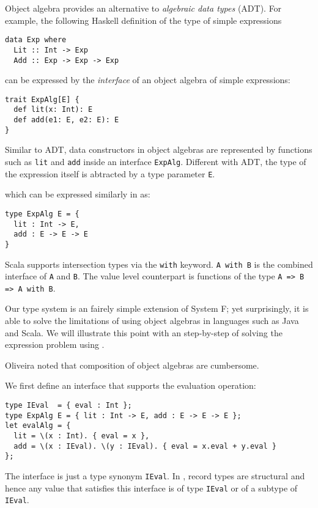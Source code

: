Object algebra provides an alternative to \emph{algebraic data types} (ADT). For example, the
following Haskell definition of the type of simple expressions
\begin{verbatim}
data Exp where
  Lit :: Int -> Exp
  Add :: Exp -> Exp -> Exp
\end{verbatim}
can be expressed by the \emph{interface} of an object algebra of simple expressions:
\begin{verbatim}
trait ExpAlg[E] {
  def lit(x: Int): E
  def add(e1: E, e2: E): E
}
\end{verbatim}
Similar to ADT, data constructors in object algebras are represented by functions such as
\lstinline{lit} and \lstinline{add} inside an interface \lstinline{ExpAlg}.
Different with ADT, the type of the expression itself is abtracted by a type
parameter \lstinline{E}.

which can be expressed similarly in \systemfi as:
\begin{verbatim}
type ExpAlg E = {
  lit : Int -> E,
  add : E -> E -> E
}
\end{verbatim}

Scala supports intersection types via the \lstinline{with} keyword. \lstinline{A with B}
is the combined interface of \lstinline{A} and \lstinline{B}. The
value level counterpart is functions of the type \lstinline {A => B => A with B}.

Our type system is an fairely simple extension of System F; yet surprisingly, it
is able to solve the limitations of using object algebras in languages such as
Java and Scala. We will illustrate this point with an step-by-step of solving
the expression problem using \systemFI.

Oliveira noted that composition of object algebras are cumbersome.

We first define an interface that supports the evaluation operation:

\begin{verbatim}
type IEval  = { eval : Int };
type ExpAlg E = { lit : Int -> E, add : E -> E -> E };
let evalAlg = {
  lit = \(x : Int). { eval = x },
  add = \(x : IEval). \(y : IEval). { eval = x.eval + y.eval }
};
\end{verbatim}

The interface is just a type synonym \lstinline{IEval}. In \systemFI, record
types are structural and hence any value that satisfies this interface is of
type \lstinline{IEval} or of a subtype of \lstinline{IEval}.


